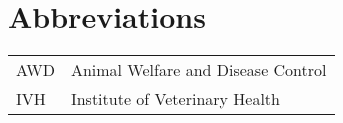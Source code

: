 \chapter*{Abbreviations}
\label{chap:abbreviations}


\begin{center}
\addtolength{\tabcolsep}{10pt} 
\begin{tabular}{ l l }
 AWD & Animal Welfare and Disease Control \\
 IVH & Institute of Veterinary Health
\end{tabular}
\addtolength{\tabcolsep}{-10pt}
\end{center}

\cleardoublepage %
